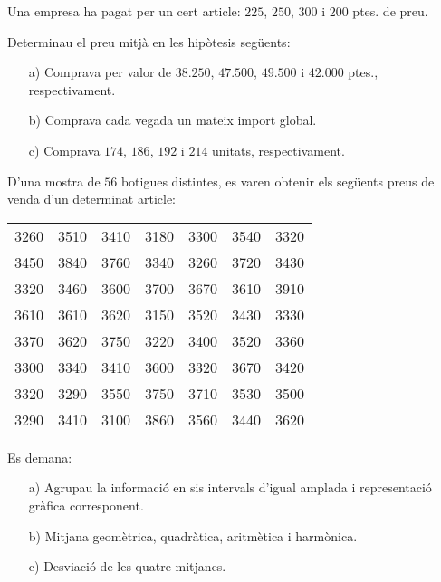 \begin{prob}
{
Una empresa ha pagat per un cert article: 
$225$, $250$, $300$ i $200$ ptes. de preu. 

Determinau el preu mitj\`a en les hip\`otesis seg\"uents:
\begin{itemize}
\item[a)] {Comprava per valor de $38.250$, $47.500$, $49.500$ i $42.000$ ptes.,
respectivament.}
\item[b)] {Comprava cada vegada un mateix import global.}
\item[c)] {Comprava $174$, $186$, $192$ i $214$ unitats, respectivament.}
\end{itemize}
}
\end{prob}

\begin{prob}
{
D'una mostra de $56$ botigues 
distintes, es varen obtenir els seg\"uents preus de venda d'un determinat 
article:
\begin{center}
\begin{tabular}{ccccccc}
3260 & 3510 & 3410 & 3180 & 3300 & 3540 & 3320 \\
3450 & 3840 & 3760 & 3340 & 3260 & 3720 & 3430 \\
3320 & 3460 & 3600 & 3700 & 3670 & 3610 & 3910 \\
3610 & 3610 & 3620 & 3150 & 3520 & 3430 & 3330 \\
3370 & 3620 & 3750 & 3220 & 3400 & 3520 & 3360 \\
3300 & 3340 & 3410 & 3600 & 3320 & 3670 & 3420 \\
3320 & 3290 & 3550 & 3750 & 3710 & 3530 & 3500 \\
3290 & 3410 & 3100 & 3860 & 3560 & 3440 & 3620 \\
\end{tabular}
\end{center}
Es demana:
\begin{itemize}
\item[a)] {Agrupau la informaci\'o en sis intervals d'igual amplada
 i representaci\'o gr\`afica
 corresponent.}
\item[b)] {Mitjana geom\`etrica, 
quadr\`atica, 
aritm\`etica 
i harm\`onica.}
\item[c)] {Desviaci\'o de les quatre mitjanes.}
\end{itemize}
}
\end{prob}


